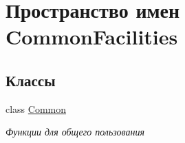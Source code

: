 \hypertarget{namespace_common_facilities}{}\section{Пространство имен Common\+Facilities}
\label{namespace_common_facilities}
\subsection*{Классы}
\begin{DoxyCompactItemize}
\item 
class \hyperlink{class_common_facilities_1_1_common}{Common}
\begin{DoxyCompactList}\small\item\em Функции для общего пользования \end{DoxyCompactList}\end{DoxyCompactItemize}

